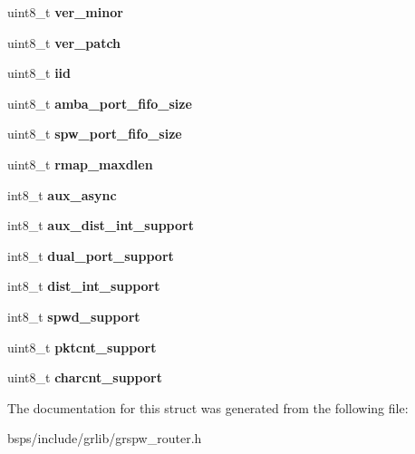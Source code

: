 \begin{DoxyCompactItemize}
uint8\+\_\+t {\bfseries ver\+\_\+minor}
\item 
\mbox{\label{structrouter__hw__info_a3bf87c70bd5ccc7272a23f46dfc7ca80}} 
uint8\+\_\+t {\bfseries ver\+\_\+patch}
\item 
\mbox{\label{structrouter__hw__info_a41a3936c2ebf03c9d26459f26e1e09a1}} 
uint8\+\_\+t {\bfseries iid}
\item 
\mbox{\label{structrouter__hw__info_a71300cc3b14a55ca5040786d79385085}} 
uint8\+\_\+t {\bfseries amba\+\_\+port\+\_\+fifo\+\_\+size}
\item 
\mbox{\label{structrouter__hw__info_ad70df164dbe9858b5b3f593f32e9e127}} 
uint8\+\_\+t {\bfseries spw\+\_\+port\+\_\+fifo\+\_\+size}
\item 
\mbox{\label{structrouter__hw__info_a870b5984d7fa765699ee25d22ed48165}} 
uint8\+\_\+t {\bfseries rmap\+\_\+maxdlen}
\item 
\mbox{\label{structrouter__hw__info_a2c25ecd54a3eea4c98940957aaa6f8e9}} 
int8\+\_\+t {\bfseries aux\+\_\+async}
\item 
\mbox{\label{structrouter__hw__info_a7e64a27c24a562008d7fb151c7f0a2f7}} 
int8\+\_\+t {\bfseries aux\+\_\+dist\+\_\+int\+\_\+support}
\item 
\mbox{\label{structrouter__hw__info_adc2bb33b701edde4e61a9ba7b193a6a3}} 
int8\+\_\+t {\bfseries dual\+\_\+port\+\_\+support}
\item 
\mbox{\label{structrouter__hw__info_aaf237ad784427ab7408601504c28919d}} 
int8\+\_\+t {\bfseries dist\+\_\+int\+\_\+support}
\item 
\mbox{\label{structrouter__hw__info_a34e24ee2fc5d26819a0daa1ca802cc17}} 
int8\+\_\+t {\bfseries spwd\+\_\+support}
\item 
\mbox{\label{structrouter__hw__info_aa06c0ce92570ce683ec7df88860316f9}} 
uint8\+\_\+t {\bfseries pktcnt\+\_\+support}
\item 
\mbox{\label{structrouter__hw__info_a98967abc98b8ed61d2c482e4afe59e82}} 
uint8\+\_\+t {\bfseries charcnt\+\_\+support}
\end{DoxyCompactItemize}


The documentation for this struct was generated from the following file\+:\begin{DoxyCompactItemize}
\item 
bsps/include/grlib/grspw\+\_\+router.\+h\end{DoxyCompactItemize}
